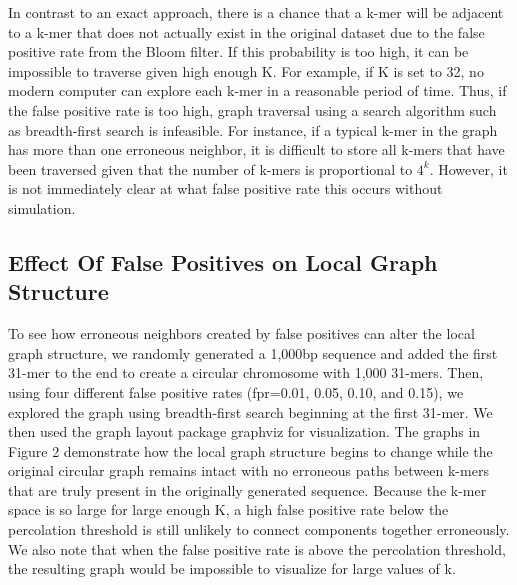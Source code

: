 \documentclass[12pt]{article} \usepackage{simplemargins}
\begin{document}
In contrast to an exact
approach, there is a chance that a k-mer will be adjacent to a k-mer
that does not actually exist in the original dataset due to the false
positive rate from the Bloom filter. If this probability is too high,
it can be impossible to traverse given high enough K. For example, if
K is set to 32, no modern computer can explore each k-mer in a
reasonable period of time. Thus, if the false positive rate is too
high, graph traversal using a search algorithm such as breadth-first
search is infeasible. For instance, if a typical k-mer in the graph has 
more than one erroneous neighbor, it is difficult to store all k-mers 
that have been traversed given that the number of k-mers is proportional 
to $4^k$. However, it is not immediately clear 
at what false positive rate this occurs without simulation.

\subsection{Effect Of False Positives on Local Graph Structure}
To see how erroneous neighbors created by false positives can alter 
the local graph structure, we randomly generated a 1,000bp sequence 
and added the first 31-mer to
the end to create a circular chromosome with 1,000 31-mers. Then,
using four different false positive rates (fpr=0.01, 0.05, 0.10, and
0.15), we explored the graph using breadth-first search beginning at
the first 31-mer. We then used the graph
layout package graphviz for visualization.
The graphs in Figure 
2 demonstrate how
the local graph structure begins to change while the original circular
graph remains intact with no erroneous paths between k-mers that are
truly present in the originally generated sequence. Because the k-mer
space is so large for large enough K, a high false positive rate below
the percolation threshold is still unlikely to connect components
together erroneously. We also note that when the false positive
rate is above the percolation threshold, the resulting graph would be
impossible to visualize for large values of k.
\end{document}
